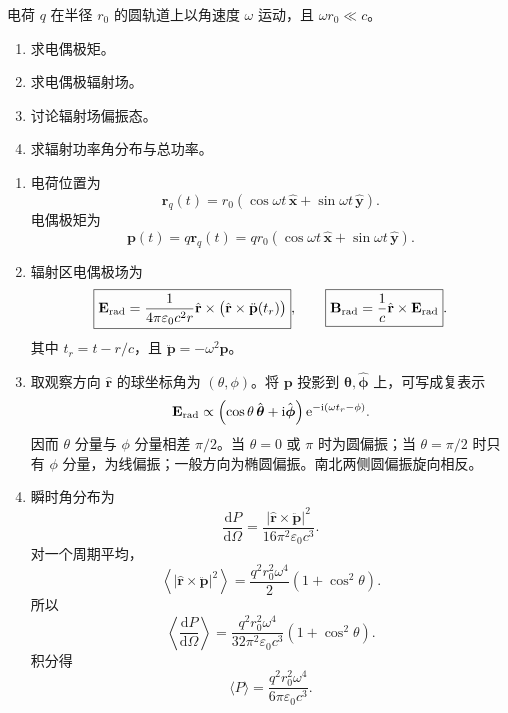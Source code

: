 \begin{question}[圆周运动电荷的电偶极辐射]
电荷 $q$ 在半径 $r_0$ 的圆轨道上以角速度 $\omega$ 运动，且 $\omega r_0\ll c$。
\begin{enumerate}
  \item 求电偶极矩。
  \item 求电偶极辐射场。
  \item 讨论辐射场偏振态。
  \item 求辐射功率角分布与总功率。
\end{enumerate}
\begin{solution}
\begin{enumerate}
  \item 电荷位置为
  \[
    \mathbf r_q(t)=r_0(\cos\omega t\,\hat{\mathbf x}+\sin\omega t\,\hat{\mathbf y}) .
  \]
  电偶极矩为
  \[
    \boxed{\mathbf p(t)=q\mathbf r_q(t)
    =qr_0(\cos\omega t\,\hat{\mathbf x}+\sin\omega t\,\hat{\mathbf y})} .
  \]

  \item 辐射区电偶极场为
  \[
    \boxed{\mathbf E_{\rm rad}=\frac{1}{4\pi\varepsilon_0c^2r}
    \hat{\mathbf r}\times\bigl(\hat{\mathbf r}\times\ddot{\mathbf p}(t_r)\bigr)},
    \qquad
    \boxed{\mathbf B_{\rm rad}=\frac1c\hat{\mathbf r}\times\mathbf E_{\rm rad}} .
  \]
  其中 $t_r=t-r/c$，且 $\ddot{\mathbf p}=-\omega^2\mathbf p$。

  \item 取观察方向 $\hat{\mathbf r}$ 的球坐标角为 $(\theta,\phi)$。将 $\mathbf p$ 投影到 $\hat{\boldsymbol\theta},\hat{\boldsymbol\phi}$ 上，可写成复表示
  \[
    \mathbf E_{\rm rad}\propto
    \left(\cos\theta\,\hat{\boldsymbol\theta}+\mathrm i\hat{\boldsymbol\phi}\right)
    \mathrm e^{-\mathrm i(\omega t_r-\phi)} .
  \]
  因而 $\theta$ 分量与 $\phi$ 分量相差 $\pi/2$。当 $\theta=0$ 或 $\pi$ 时为圆偏振；当 $\theta=\pi/2$ 时只有 $\phi$ 分量，为线偏振；一般方向为椭圆偏振。南北两侧圆偏振旋向相反。

  \item 瞬时角分布为
  \[
    \frac{\mathrm dP}{\mathrm d\Omega}
    =\frac{|\hat{\mathbf r}\times\ddot{\mathbf p}|^2}{16\pi^2\varepsilon_0c^3} .
  \]
  对一个周期平均，
  \[
    \left\langle |\hat{\mathbf r}\times\ddot{\mathbf p}|^2\right\rangle
    =\frac{q^2r_0^2\omega^4}{2}(1+\cos^2\theta) .
  \]
  所以
  \[
    \boxed{\left\langle\frac{\mathrm dP}{\mathrm d\Omega}\right\rangle
    =\frac{q^2r_0^2\omega^4}{32\pi^2\varepsilon_0c^3}(1+\cos^2\theta)} .
  \]
  积分得
  \[
    \boxed{\langle P\rangle=\frac{q^2r_0^2\omega^4}{6\pi\varepsilon_0c^3}} .
  \]
\end{enumerate}
\end{solution}
\end{question}

